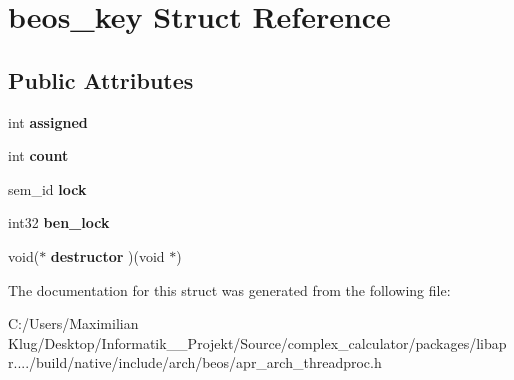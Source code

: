 \hypertarget{structbeos__key}{}\section{beos\+\_\+key Struct Reference}
\label{structbeos__key}
\subsection*{Public Attributes}
\begin{DoxyCompactItemize}
\item 
\mbox{\label{structbeos__key_ab0c09ebde0e90dba52fcdd4675f2efcf}} 
int {\bfseries assigned}
\item 
\mbox{\label{structbeos__key_a9a8f0ecaf460a97d7833e5abf5418be9}} 
int {\bfseries count}
\item 
\mbox{\label{structbeos__key_ae0f8c79e5147e810cf89271970fc1c89}} 
sem\+\_\+id {\bfseries lock}
\item 
\mbox{\label{structbeos__key_a9efd8d597bb9f74f5e522c7d9a2a5941}} 
int32 {\bfseries ben\+\_\+lock}
\item 
\mbox{\label{structbeos__key_a04bc9158e2c7c4145f68c8fcebfccc0a}} 
void($\ast$ {\bfseries destructor} )(void $\ast$)
\end{DoxyCompactItemize}


The documentation for this struct was generated from the following file\+:\begin{DoxyCompactItemize}
\item 
C\+:/\+Users/\+Maximilian Klug/\+Desktop/\+Informatik\+\_\+\_\+\+Projekt/\+Source/complex\+\_\+calculator/packages/libapr..../build/native/include/arch/beos/apr\+\_\+arch\+\_\+threadproc.\+h\end{DoxyCompactItemize}
